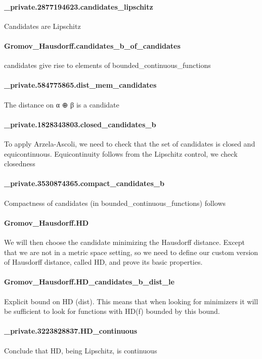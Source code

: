 \documentclass{article}
\begin{document}
\paragraph{\_private.2877194623.candidates\_lipschitz}
\par
Candidates are Lipschitz
\paragraph{Gromov\_Hausdorff.candidates\_b\_of\_candidates}
\par
candidates give rise to elements of bounded\_continuous\_functions
\paragraph{\_private.584775865.dist\_mem\_candidates}
\par
The distance on α ⊕ β is a candidate
\paragraph{\_private.1828343803.closed\_candidates\_b}
\par
To apply Arzela-Ascoli, we need to check that the set of candidates is closed and equicontinuous.
Equicontinuity follows from the Lipschitz control, we check closedness
\paragraph{\_private.3530874365.compact\_candidates\_b}
\par
Compactness of candidates (in bounded\_continuous\_functions) follows
\paragraph{Gromov\_Hausdorff.HD}
\par
We will then choose the candidate minimizing the Hausdorff distance. Except that we are not
in a metric space setting, so we need to define our custom version of Hausdorff distance,
called HD, and prove its basic properties.
\paragraph{Gromov\_Hausdorff.HD\_candidates\_b\_dist\_le}
\par
Explicit bound on HD (dist). This means that when looking for minimizers it will
be sufficient to look for functions with HD(f) bounded by this bound.
\paragraph{\_private.3223828837.HD\_continuous}
\par
Conclude that HD, being Lipschitz, is continuous
\end{document}
